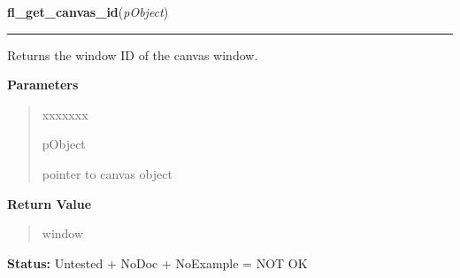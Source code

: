 \hspace{.8\funcindent}\begin{boxedminipage}{\funcwidth}

    \raggedright \textbf{fl\_get\_canvas\_id}(\textit{pObject})

    \vspace{-1.5ex}

    \rule{\textwidth}{0.5\fboxrule}
\setlength{\parskip}{2ex}
    Returns the window ID of the canvas window.

\setlength{\parskip}{1ex}
      \textbf{Parameters}
      \vspace{-1ex}

      \begin{quote}
        \begin{Ventry}{xxxxxxx}

          \item[pObject]

          pointer to canvas object

        \end{Ventry}

      \end{quote}

      \textbf{Return Value}
    \vspace{-1ex}

      \begin{quote}
      window

      \end{quote}

\textbf{Status:} Untested + NoDoc + NoExample = NOT OK



    \end{boxedminipage}

    \label{xformslib:library:fl_get_canvas_colormap}

    \vspace{0.5ex}

